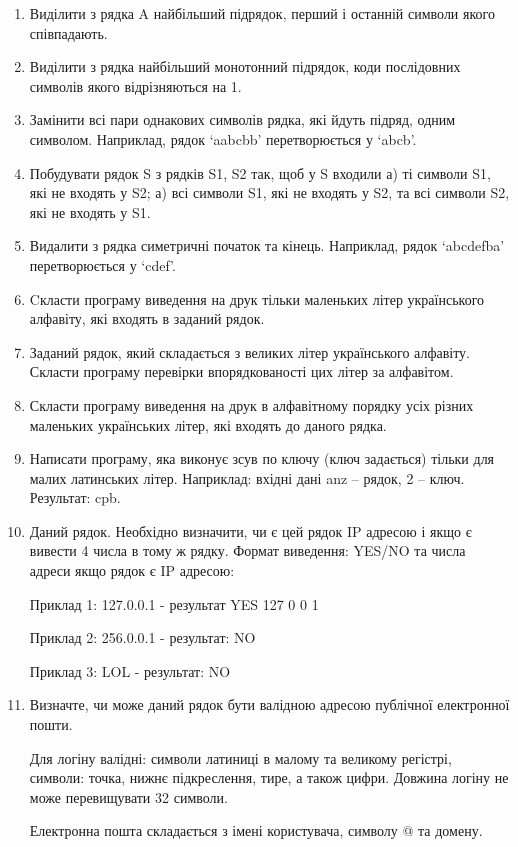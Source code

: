 \documentclass[]{article}
\makeatletter
\newcommand{\xslalph}[1]{\expandafter\@xslalph\csname c@#1\endcsname}
\newcommand{\@xslalph}[1]{%
    \ifcase#1\or а\or б\or в\or г\or д\or e\or є\or ж\or з\or i%
    \or й\or к\or л\or м\or н\or о\or п\or р\or с\or т%
    \or у\or ф\or х\or ц\or ч\or ш\or ю\or я\or аа\or бб\or вв %
    \else\@ctrerr\fi%
}
\makeatother
\begin{document}
\begin{enumerate}
\begin{enumerate}[label=\xslalph*)]
\end{enumerate}
\item  Виділити з рядка A найбільший підрядок, перший і останній символи якого співпадають.
\item  Виділити з рядка найбільший монотонний підрядок, коди послідовних символів якого відрізняються на 1.
\item  Замінити всі пари однакових символів рядка, які йдуть підряд, одним символом. Наприклад, рядок ‘aabcbb’ перетворюється у ‘abcb’.
\item  Побудувати рядок S з рядків S1, S2 так, щоб у S входили
а) ті символи S1, які не входять у S2;
а) всі символи S1, які не входять у S2, та всі символи S2, які не входять у S1.
\item  Видалити з рядка симетричні початок та кінець. Наприклад, рядок ‘abcdefba’ перетворюється у ‘cdef’.
\item  Cкласти  програму виведення на друк тільки маленьких літер українського алфавіту, які входять в заданий рядок.
\item  Заданий рядок, який складається з великих літер українського алфавіту. Скласти  програму перевірки впорядкованості цих літер за алфавітом.
\item  Скласти  програму виведення на друк в алфавітному порядку усіх різних маленьких українських літер, які входять до даного рядка.
\item  Написати програму, яка виконує зсув по ключу (ключ задається) тільки для малих латинських літер. Наприклад: вхідні дані  anz – рядок, 2 – ключ. Результат: cpb. 


\item
Даний рядок. 
Необхідно визначити, чи є цей рядок IP адресою і якщо є вивести 4 числа в тому ж рядку.  
Формат виведення: YES/NO та числа адреси якщо рядок є IP адресою: 

Приклад 1: 127.0.0.1 - результат YES 127 0 0 1

Приклад 2: 256.0.0.1 - результат: NO

Приклад 3: LOL - результат: NO

\item
Визначте, чи може даний рядок бути валідною адресою публічної електронної пошти. 

Для логіну валідні: символи латиниці в малому та великому регістрі, символи: точка, нижнє підкреслення, тире, а також цифри. Довжина логіну не може перевищувати 32 символи.

Електронна пошта складається з імені користувача, символу @ та домену.


\end{enumerate}
\end{document}
